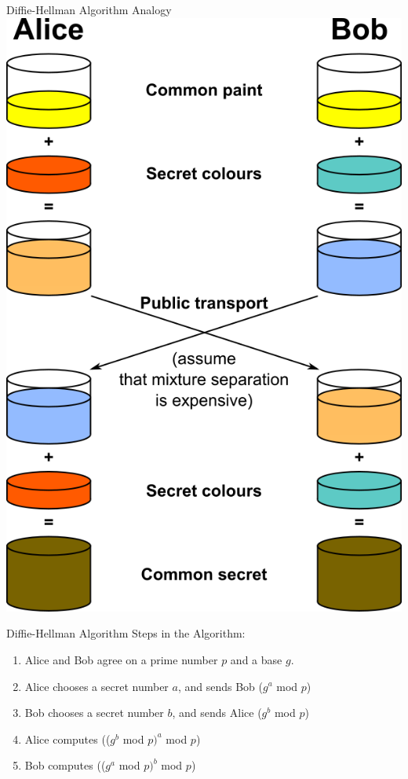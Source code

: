 \documentclass[xcolor=dvipsnames]{beamer}
\begin{document}
\begin{frame}{Diffie-Hellman Algorithm Analogy}
\centering
\includegraphics[scale=0.2]{dh.png}
\end{frame}

\begin{frame}{Diffie-Hellman Algorithm}
Steps in the Algorithm:
\begin{enumerate}
\item Alice and Bob agree on a prime number $p$ and a base $g$.
\item Alice chooses a secret number $a$, and sends Bob ($g^a$  mod $p $)
\item Bob chooses a secret number $b$, and sends Alice ($g^b$  mod $p $)
\item Alice computes (($g^b$  mod $p )^a$ mod $p$)
\item Bob computes (($g^a$  mod $p )^b$ mod $p$)
\end{enumerate}
\end{frame}
\end{document}
